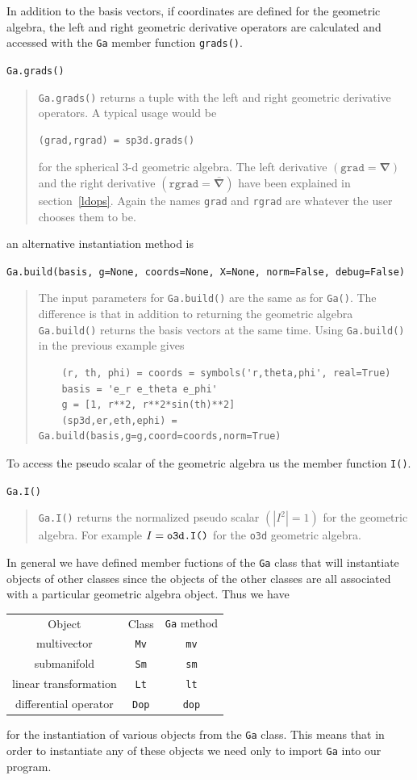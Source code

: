 \documentclass[12pt]{report}
\newcommand{\bm}[1]{\boldsymbol{#1}}
\newcommand{\lp}{\left (}
\newcommand{\rp}{\right )}
\newcommand{\abs}[1]{\left |{#1}\right |}
\newcommand{\paren}[1]{\lp {#1} \rp}
\newcommand{\T}[1]{\texttt{#1}}
\begin{document}
In addition to the basis vectors, if coordinates are defined for the geometric algebra, the 
left and right geometric derivative operators are calculated and accessed with the \T{Ga} 
member function \T{grads()}.

\T{Ga.grads()}
\begin{quote}
	\T{Ga.grads()} returns a tuple with the left and right geometric derivative operators. A
	typical usage would be 
	\begin{lstlisting}[numbers=none]
	(grad,rgrad) = sp3d.grads()
   	\end{lstlisting}
   	for the spherical 3-d geometric algebra. The left derivative $\paren{\T{grad} =\bm{\nabla}}$ and the
   	right derivative $\paren{\T{rgrad} = \bm{\bar{\nabla}}}$ have been explained in section~\ref{ldops}. Again
   	the names \T{grad} and \T{rgrad} are whatever the user chooses them to be. 
\end{quote}

an alternative instantiation method is

\T{Ga.build(basis, g=None, coords=None, X=None, norm=False, debug=False)}
\begin{quote}
	The input parameters for \T{Ga.build()} are the same as for \T{Ga()}.  The difference is
	that in addition to returning the geometric algebra \T{Ga.build()} returns the basis vectors
	at the same time. Using \T{Ga.build()} in the previous example gives
   \begin{lstlisting}
   	(r, th, phi) = coords = symbols('r,theta,phi', real=True)
   	basis = 'e_r e_theta e_phi'
   	g = [1, r**2, r**2*sin(th)**2]
   	(sp3d,er,eth,ephi) = Ga.build(basis,g=g,coord=coords,norm=True)	
	\end{lstlisting}
\end{quote}

To access the pseudo scalar of the geometric algebra us the member function \T{I()}.

\T{Ga.I()}
\begin{quote}
	\T{Ga.I()} returns the normalized pseudo scalar $\paren{\abs{I^{2}}=1}$ for the 
	geometric algebra. For example $I = \mbox{\T{o3d.I()}}$ for the \T{o3d} geometric 
	algebra.
\end{quote}

In general we have defined member fuctions of the \T{Ga} class that will instantiate objects
of other classes since the objects of the other classes are all associated with a particular
geometric algebra object.  Thus we have
\begin{center}
\begin{longtable}{ccc}
	Object &  Class & \T{Ga} method \\
	multivector & \T{Mv} & \T{mv} \\
	submanifold & \T{Sm} & \T{sm} \\
	linear transformation & \T{Lt} & \T{lt} \\
	differential operator & \T{Dop} & \T{dop}
\end{longtable}
\end{center}
for the instantiation of various objects from the \T{Ga} class.  This means that in order to 
instantiate any of these objects we need only to import \T{Ga} into our program.
\end{document}
